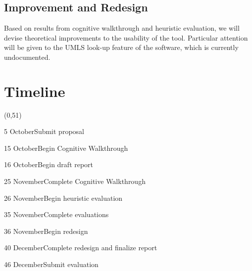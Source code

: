\documentclass[11pt]{article}
\begin{document}
\subsection{Improvement and Redesign}

Based on results from cognitive walkthrough and heuristic evaluation, we will devise theoretical improvements to the usability of the tool. Particular attention will be given to the UMLS look-up feature of the software, which is currently undocumented.

\section{Timeline}
\begin{timeline}{2in}(0,51)
\optrule
  \item[5]{October}{Submit proposal}
  \item[15]{October}{Begin Cognitive Walkthrough}
  \item[16]{October}{Begin draft report}
  \item[25]{November}{Complete Cognitive Walkthrough}
  \item[26]{November}{Begin heuristic evaluation}
  \item[35]{November}{Complete evaluations}
  \item[36]{November}{Begin redesign}
  \item[40]{December}{Complete redesign and finalize report}
  \item[46]{December}{Submit evaluation}
\end{timeline}
\end{document}
